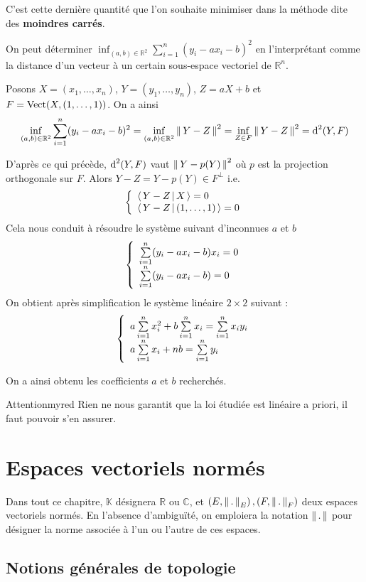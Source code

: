     C’est cette dernière quantité que l’on souhaite minimiser dans la méthode dite des \textbf{moindres carrés}.

    On peut déterminer $\inf_{(a,b) \in \mathbb{R}^2} \sum\limits_{i=1}^n (y_i -ax_i - b)^2$ en l’interprétant comme la distance d’un vecteur à un certain sous-espace vectoriel de $\mathbb{R}^n$.

    Posons $X = (x_1,\ldots,x_n)$, $Y = (y_1,\ldots,y_n)$, $Z = aX + b$ et $F = \operatorname{Vect}(X,(1,\ldots,1))$. On a ainsi 
    \[ \inf_{(a,b) \in \mathbb{R}^2} \sum\limits_{i=1}^n (y_i -ax_i - b)^2 = \inf_{(a,b) \in \mathbb{R}^2} \left\lVert\,Y - Z\,\right\rVert^2 = \inf_{Z \in F} \left\lVert\,Y - Z\,\right\rVert^2 = \operatorname{d}^2(Y,F) \]
 
    D’après ce qui précède, $\operatorname{d}^2(Y,F)$ vaut $\left\lVert\,Y - p(Y)\,\right\rVert^2$ où $p$ est la projection orthogonale sur $F$. Alors $Y - Z = Y - p(Y) \in F^{\perp}$ i.e. 
    \[ \et{\spr{Y-Z}{X} = 0}{\spr{Y-Z}{(1,\ldots,1)} = 0} \] 
    Cela nous conduit à résoudre le système suivant d’inconnues $a$ et $b$ 
    \[ \et{\sum\limits_{i = 1}^n (y_i - ax_i - b)x_i = 0}{\sum\limits_{i = 1}^n (y_i - ax_i - b) = 0} \] 
    On obtient après simplification le système linéaire $2 \times 2$ suivant :
    \[ \et{a \sum\limits_{i = 1}^n x_i^2 + b \sum\limits_{i=1}^n x_i = \sum\limits_{i=1}^n x_i y_i}{a \sum\limits_{i=1}^n x_i + nb = \sum\limits_{i = 1}^n y_i} \]

    On a ainsi obtenu les coefficients $a$ et $b$ recherchés. 

    \begin{omed}{Attention}{myred}
        Rien ne nous garantit que la loi étudiée est linéaire a priori, il faut pouvoir s’en assurer.
    \end{omed}

\section{Espaces vectoriels normés}

Dans tout ce chapitre, $\mathbb{K}$ désignera $\mathbb{R}$ ou $\mathbb{C}$, et $\left(E,\left\lVert\,.\,\right\rVert_E\right), \left(F, \left\lVert\,.\,\right\rVert_F\right)$ deux espaces vectoriels normés. En l’absence d’ambiguïté, on emploiera la notation $\left\lVert\,.\,\right\rVert$ pour désigner la norme associée à l’un ou l’autre de ces espaces.

\subsection{Notions générales de topologie}

